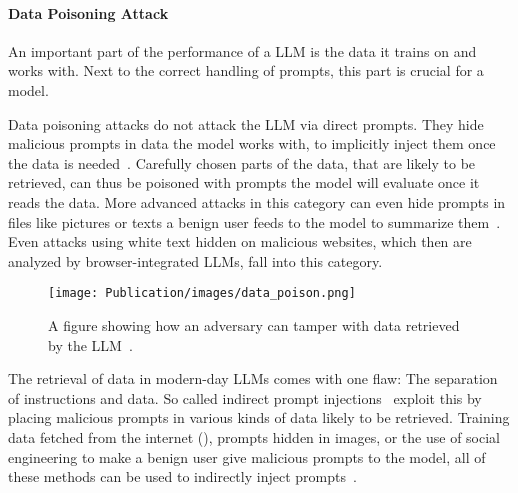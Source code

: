 \paragraph{Data Poisoning Attack}
An important part of the performance of a LLM is the data it trains on and works with. 
Next to the correct handling of prompts, this part is crucial for a model.

Data poisoning attacks do not attack the LLM via direct prompts. 
They hide malicious prompts in data the model works with, to implicitly inject them once the data is needed~\cite{TrainingPoison}. 
Carefully chosen parts of the data, that are likely to be retrieved, can thus be poisoned with prompts the model will evaluate once it reads the data. 
More advanced attacks in this category can even hide prompts in files like pictures or texts a benign user feeds to the model to summarize them~\cite{10.1145/3605764.3623985, yan2023backdooring}.
Even attacks using white text hidden on malicious websites, which then are analyzed by browser-integrated LLMs, fall into this category.

\begin{figure} [ht]
  \centering
  \texttt{[image: Publication/images/data\_poison.png]}
  \caption{A figure showing how an adversary can tamper with data retrieved by the LLM~\cite{10.1145/3605764.3623985}.}
  \label{fig:poison}
\end{figure}

The retrieval of data in modern-day LLMs comes with one flaw: The separation of instructions and data.
So called indirect prompt injections~\cite{10.1145/3605764.3623985} exploit this by placing malicious prompts in various kinds of data likely to be retrieved. 
Training data fetched from the internet (), prompts hidden in images, or the use of social engineering to make a benign user give malicious prompts to the model, all of these methods can be used to indirectly inject prompts~\cite{10.1145/3605764.3623985}.

